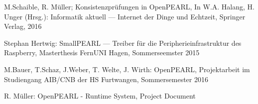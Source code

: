 \begin{thebibliography}{99}
   M.Schaible, R. M\"uller; Konsistenzpr\"ufungen in OpenPEARL,
   In W.A. Halang, H. Unger (Hrsg.): Informatik aktuell --- 
   Internet der Dinge und Echtzeit, Springer Verlag, 2016

    Stephan Hertwig: SmallPEARL ---
    Treiber f\"ur die Peripherieinfrastruktur des Raspberry,
    Masterthesis FernUNI Hagen, Sommerseemster 2015
 
    M.Bauer, T.Schaz, J.Weber, T. Welte, J. Wirth: OpenPEARL,
    Projektarbeit im Studiengang AIB/CNB der HS Furtwangen, Sommersemester 2016

   R. M\"uller: OpenPEARL - Runtime System, Project Document

\end{thebibliography}
~                          

